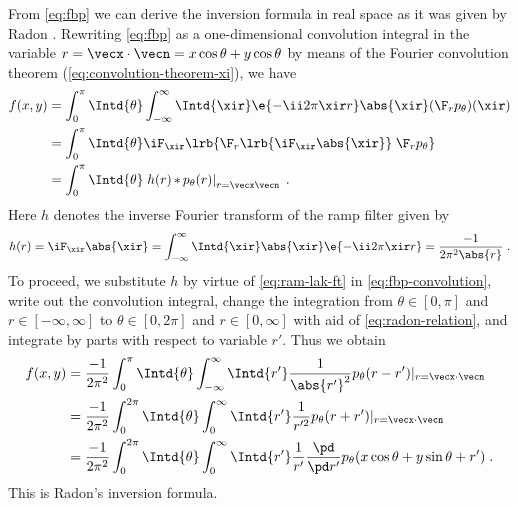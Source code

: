 \documentclass[
twoside,
openright,
titlepage,
numbers=noenddot,
headinclude,
fleqn,
a4paper,
footinclude=true,
cleardoublepage=empty,
abstractoff,
BCOR=5mm,
paper=a4,
fontsize=11pt,
british,ngerman,american,
]{scrreprt}
\begin{document}
From \cref{eq:fbp} we can derive the inversion formula in real space
as it was given by Radon \cite{Radon1917}.  Rewriting \cref{eq:fbp} as
a one-dimensional convolution integral in the variable
$r=\vecx\cdot\vecn=x\cos\theta+y\cos\theta$ by means of the Fourier
convolution theorem (\cref{eq:convolution-theorem-xi}), we have
\begin{equation}
  \label{eq:fbp-convolution}
  \begin{split}
    f(x,y) &= \int_0^{\pi}\Intd{\theta} \int_{-\infty}^\infty\Intd{\xir}
    \e{-\ii 2\pi\xir r} \abs{\xir} (\F_r p_\theta)(\xir)
    \\ &= \int_0^{\pi}\Intd{\theta} \iF_\xir
    \lrb{\F_r\lrb{\iF_\xir\abs{\xir}} \; \F_r p_\theta }
    \\ &= \int_0^{\pi}\Intd{\theta} \left. h(r) 
      \operatorname{\ast} p_\theta(r) \right|_{r=\vecx\vecn} \;.
  \end{split}
\end{equation}
Here $h$ denotes the inverse Fourier transform of the ramp filter given
by \cite{Erdelyi1954}
\begin{equation}
  \label{eq:ram-lak-ft}
  \begin{split}
    h(r) = \iF_\xir\abs{\xir} 
    = \int_{-\infty}^\infty\Intd{\xir}\abs{\xir} \e{-\ii 2\pi\xir r} 
    = \frac{-1}{2\pi^2\abs{r}} \;.
  \end{split}
\end{equation}
To proceed, we substitute $h$ by virtue of \cref{eq:ram-lak-ft} in
\cref{eq:fbp-convolution}, write out the convolution integral, change
the integration from $\theta\in[0,\pi]$ and $r\in[-\infty,\infty]$ to
$\theta\in[0,2\pi]$ and $r\in[0,\infty]$ with aid of
\cref{eq:radon-relation}, and integrate by parts with respect to
variable $r'$.  Thus we obtain
\begin{equation}
  \label{eq:radon-inversion}
  \begin{split}
    f(x,y) &= \frac{-1}{2\pi^2} \int_0^{\pi}\Intd{\theta}
    \int_{-\infty}^{\infty}\Intd{r'} 
    \frac{1}{\abs{r'}^2}p_\theta(r-r')|_{r=\vecx\cdot\vecn}
    \\ &= \frac{-1}{2\pi^2} \int_0^{2\pi}\Intd{\theta} 
    \int_{0}^{\infty}\Intd{r'} 
    \frac{1}{r'^2}p_\theta(r+r')|_{r=\vecx\cdot\vecn}
  \\ &= \frac{-1}{2\pi^2} \int_0^{2\pi}\Intd{\theta} 
  \int_{0}^{\infty}\Intd{r'} 
    \frac{1}{r'}\frac{\pd}{\pd r'}
    p_\theta(x\cos\theta+y\sin\theta+r') \;.
  \end{split}
\end{equation}
This is Radon's inversion formula.
\end{document}
